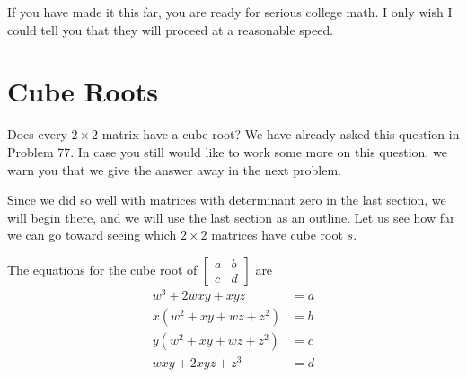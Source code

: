 \documentclass{article}
\begin{document}
If you have made it this far, you are ready for serious college math. I only wish I could tell you that they will proceed at a reasonable speed.




\newpage

\section{Cube Roots}

Does every $2 \times 2$ matrix have a cube root? We have already asked this question in Problem 77. In case you still would like to work some more on this question, we warn you that we give the answer away in the next problem.

Since we did so well with matrices with determinant zero in the last section, we will begin there, and we will use the last section as an outline. Let us see how far we can go toward seeing which $2 \times 2$ matrices have cube root $s$.

The equations for the cube root of $\begin{bmatrix} a & b \\ c & d \end{bmatrix}$ are
\begin{align*} 
     w^3 + 2wxy + xyz & = a \\
x(w^2 + xy + wz +z^2) & = b \\
y(w^2 + xy + wz +z^2) & = c \\
     wxy + 2xyz + z^3 & = d
\end{align*}
\end{document}
